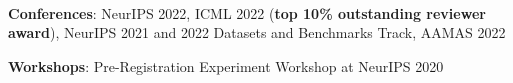 \documentclass[]{lukas-cv-openfont}
\begin{document}
\noindent
{}
\\
\largesectionsep




\noindent
\begin{tightitemize}{1.0em}
\item \textbf{Conferences}: NeurIPS 2022, ICML 2022 (\textbf{top 10\% outstanding reviewer award}), NeurIPS 2021 and 2022 Datasets and Benchmarks Track, AAMAS 2022
\item \textbf{Workshops}: Pre-Registration Experiment Workshop at NeurIPS 2020
\end{tightitemize}
\largesectionsep



\end{document}
